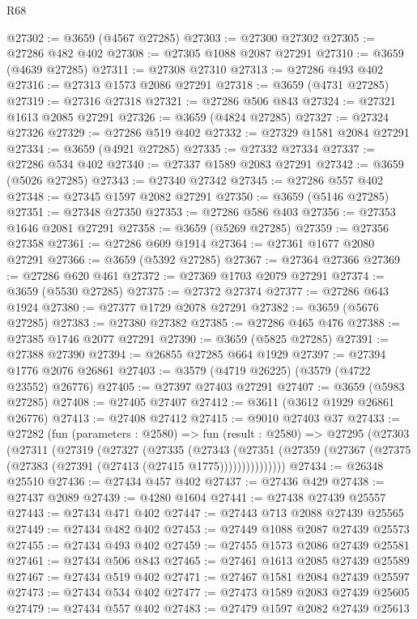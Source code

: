 \begin{lexlean}{R68}
\begin{coremodule}
@27302 := @3659 (@4567 @27285)
@27303 := @27300 @27302
@27305 := @27286 @482 @402
@27308 := @27305 @1088 @2087 @27291
@27310 := @3659 (@4639 @27285)
@27311 := @27308 @27310
@27313 := @27286 @493 @402
@27316 := @27313 @1573 @2086 @27291
@27318 := @3659 (@4731 @27285)
@27319 := @27316 @27318
@27321 := @27286 @506 @843
@27324 := @27321 @1613 @2085 @27291
@27326 := @3659 (@4824 @27285)
@27327 := @27324 @27326
@27329 := @27286 @519 @402
@27332 := @27329 @1581 @2084 @27291
@27334 := @3659 (@4921 @27285)
@27335 := @27332 @27334
@27337 := @27286 @534 @402
@27340 := @27337 @1589 @2083 @27291
@27342 := @3659 (@5026 @27285)
@27343 := @27340 @27342
@27345 := @27286 @557 @402
@27348 := @27345 @1597 @2082 @27291
@27350 := @3659 (@5146 @27285)
@27351 := @27348 @27350
@27353 := @27286 @586 @403
@27356 := @27353 @1646 @2081 @27291
@27358 := @3659 (@5269 @27285)
@27359 := @27356 @27358
@27361 := @27286 @609 @1914
@27364 := @27361 @1677 @2080 @27291
@27366 := @3659 (@5392 @27285)
@27367 := @27364 @27366
@27369 := @27286 @620 @461
@27372 := @27369 @1703 @2079 @27291
@27374 := @3659 (@5530 @27285)
@27375 := @27372 @27374
@27377 := @27286 @643 @1924
@27380 := @27377 @1729 @2078 @27291
@27382 := @3659 (@5676 @27285)
@27383 := @27380 @27382
@27385 := @27286 @465 @476
@27388 := @27385 @1746 @2077 @27291
@27390 := @3659 (@5825 @27285)
@27391 := @27388 @27390
@27394 := @26855 @27285 @664 @1929
@27397 := @27394 @1776 @2076 @26861
@27403 := @3579 (@4719 @26225) (@3579 (@4722 @23552) @26776)
@27405 := @27397 @27403 @27291
@27407 := @3659 (@5983 @27285)
@27408 := @27405 @27407
@27412 := @3611 (@3612 @1929 @26861 @26776)
@27413 := @27408 @27412
@27415 := @9010 @27403 @37
@27433 := @27282
    (fun (parameters : @2580) =>
    fun (result : @2580) =>
    @27295
      (@27303
        (@27311
          (@27319
            (@27327
              (@27335
                (@27343
                  (@27351
                    (@27359 (@27367 (@27375 (@27383 (@27391 (@27413 (@27415 @1775)))))))))))))))
@27434 := @26348 @25510
@27436 := @27434 @457 @402
@27437 := @27436 @429
@27438 := @27437 @2089
@27439 := @4280 @1604
@27441 := @27438 @27439 @25557
@27443 := @27434 @471 @402
@27447 := @27443 @713 @2088 @27439 @25565
@27449 := @27434 @482 @402
@27453 := @27449 @1088 @2087 @27439 @25573
@27455 := @27434 @493 @402
@27459 := @27455 @1573 @2086 @27439 @25581
@27461 := @27434 @506 @843
@27465 := @27461 @1613 @2085 @27439 @25589
@27467 := @27434 @519 @402
@27471 := @27467 @1581 @2084 @27439 @25597
@27473 := @27434 @534 @402
@27477 := @27473 @1589 @2083 @27439 @25605
@27479 := @27434 @557 @402
@27483 := @27479 @1597 @2082 @27439 @25613

\end{coremodule}
\end{lexlean}

